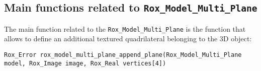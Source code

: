 \subsection{Main functions related to {\tt Rox\_Model\_Multi\_Plane}}
\label{sse:model_multi_plane_functs}

The main function related to the \lstinline$Rox_Model_Multi_Plane$ is the function that allows to define an additional textured quadrilateral belonging to the 3D object:
\begin{lstlisting}
Rox_Error rox_model_multi_plane_append_plane(Rox_Model_Multi_Plane model, Rox_Image image, Rox_Real vertices[4])
\end{lstlisting}
